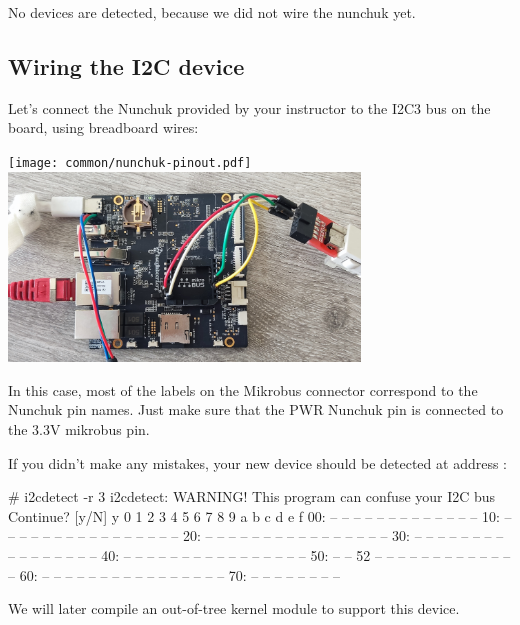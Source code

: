 No devices are detected, because we did not wire the nunchuk yet.

\subsection{Wiring the I2C device}

Let's connect the Nunchuk provided by your instructor
to the I2C3 bus on the board, using breadboard wires:

\texttt{[image: common/nunchuk-pinout.pdf]}
\includegraphics[width=0.7\textwidth]{common/beagleplay-connect-nunchuk.jpg}

In this case, most of the labels on the Mikrobus connector correspond to the
Nunchuk pin names. Just make sure that the PWR Nunchuk pin is connected to the
3.3V mikrobus pin.

If you didn't make any mistakes, your new device should be detected at
address :

\begin{bashinput}
# i2cdetect -r 3
i2cdetect: WARNING! This program can confuse your I2C bus
Continue? [y/N] y
     0  1  2  3  4  5  6  7  8  9  a  b  c  d  e  f
00:          -- -- -- -- -- -- -- -- -- -- -- -- --
10: -- -- -- -- -- -- -- -- -- -- -- -- -- -- -- --
20: -- -- -- -- -- -- -- -- -- -- -- -- -- -- -- --
30: -- -- -- -- -- -- -- -- -- -- -- -- -- -- -- --
40: -- -- -- -- -- -- -- -- -- -- -- -- -- -- -- --
50: -- -- 52 -- -- -- -- -- -- -- -- -- -- -- -- --
60: -- -- -- -- -- -- -- -- -- -- -- -- -- -- -- --
70: -- -- -- -- -- -- -- --
\end{bashinput}

We will later compile an out-of-tree kernel module to support this device.
